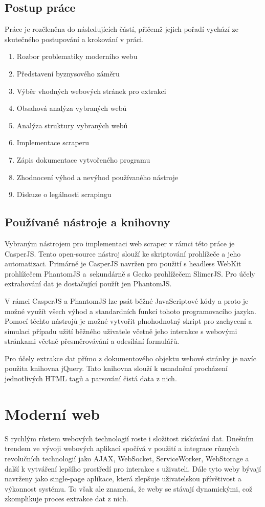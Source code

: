 \documentclass[11pt,a4paper]{article}
\begin{document}
\subsection{Postup práce}
Práce je rozčleněna do následujících částí, přičemž jejich pořadí vychází ze skutečného postupování a krokování v práci.
\begin{enumerate}
\item Rozbor problematiky moderního webu
\item Představení byznysového záměru
\item Výběr vhodných webových stránek pro extrakci
\item Obsahová analýza vybraných webů
\item Analýza struktury vybraných webů
\item Implementace scraperu
\item Zápis dokumentace vytvořeného programu
\item Zhodnocení výhod a nevýhod používaného nástroje
\item Diskuze o legálnosti scrapingu
\end{enumerate}

\subsection{Používané nástroje a knihovny}
Vybraným nástrojem pro implementaci web scraper v rámci této práce je CasperJS. Tento open-source nástroj slouží ke skriptování prohlížeče a jeho automatizaci. Primárně je CasperJS navržen pro použití s headless WebKit prohlížečem PhantomJS a~sekundárně s Gecko prohlížečem SlimerJS. Pro účely extrahování dat je dostačující použít jen PhantomJS. 

V rámci CasperJS a PhantomJS lze psát běžné JavaScriptové kódy a proto je možné využít všech výhod a standardních funkcí tohoto programovacího jazyka. Pomocí těchto nástrojů je možné vytvořit plnohodnotný skript pro zachycení a simulaci případu užití běžného uživatele včetně jeho interakce s webovými stránkami včetně přesměrovávání a odesílání formulářů.

Pro účely extrakce dat přímo z dokumentového objektu webové stránky je navíc použita knihovna jQuery. Tato knihovna slouží k usnadnění procházení jednotlivých HTML tagů a parsování čistá data z nich.


\section{Moderní web}
S rychlým růstem webových technologií roste i složitost získávání dat. Dnešním trendem ve vývoji webových aplikací spočívá v použití a integrace různých revolučních technologií jako AJAX, WebSocket, ServiceWorker, WebStorage a další k vytváření lepšího prostředí pro interakce s uživateli. Dále tyto weby bývají navrženy jako single-page aplikace, která zlepšuje uživatelskou přívětivost a výkonnost systému. To však ale znamená, že weby se stávají dynamickými, což zkomplikuje proces extrakce dat z nich.
\end{document}
